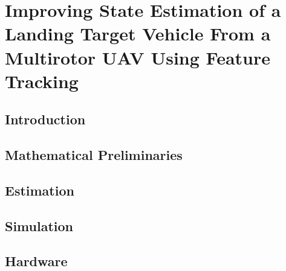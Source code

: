 
\chapter[Improving State Estimation of a Landing Target Vehicle
From a Multirotor UAV Using Feature Tracking]{Improving State Estimation of a
  Landing Target Vehicle From a Multirotor UAV Using Feature
Tracking\protect\footnotemark}
\label{chp:estimation_paper}

\graphicspath{{estimation_paper/}}

\section{Introduction} \label{sec:intro}



\section{Mathematical Preliminaries} \label{sec:math_prelim}




\section{Estimation} \label{sec:estimation}





\section{Simulation} \label{sec:est_paper_simulation}


\section{Hardware} \label{sec:est_paper_hardware}







